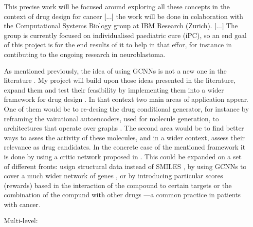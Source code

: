 \documentclass{article}
\begin{document}
This precise work will be focused around exploring all these concepts in the context of
drug design for cancer [...] the work will be done in colaboration with the
Computational Systems Biology group at IBM Research (Zurich). [...] The group is
currently focused on individualised paediatric cure (iPC), so an end goal of this
project is for the end results of it to help in that effor, for instance in contibuting
to the ongoing research in neuroblastoma.

As mentioned previously, the idea of using GCNNs is not a new one in the literature
\cite{Sun2019}. My project will build upon those ideas presented in the literature,
expand them and test their feasibility by implementing them into a wider framework for
drug design \cite{Born2019}. In that context two main areas of application appear. One
of them would be to re-desing the drug conditional generator, for instance by reframing
the vairational autoencoders, used for molecule generation, to architectures that
operate over graphs \cite{Simonovsky2018,Li2018,Li2018a}. The second area would be to
find better ways to asses the activity of these molecules, and in a wider context,
assess their relevance as drug candidates. In the concrete case of the mentioned
framework it is done by using a critic network proposed in \cite{Manica2019}. This could
be expanded on a set of different fronts: usign structural data instead of SMILES
\cite{Li,Do2019}, by using GCNNs to cover a much wider network of genes
\cite{Oskooei2019, Wang2019}, or by introducing particular scores (rewards) based in the
interaction of the compound to certain targets \cite{YingkaiGao2018, Zhavoronkov2019} or
the combination of the compund with other drugs \cite{Zitnik2018} ---a common practice
in patients with cancer.

Multi-level:


\end{document}
